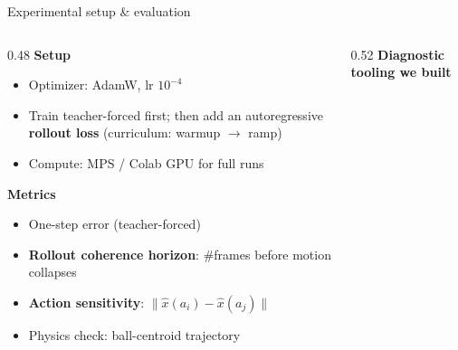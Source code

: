 \documentclass[aspectratio=169]{beamer}
\begin{document}
\begin{frame}{Experimental setup \& evaluation}
  \begin{columns}
    \begin{column}{0.48\textwidth}
      \textbf{Setup}
      \begin{itemize}
        \item Optimizer: AdamW, lr $10^{-4}$
        \item Train teacher-forced first; then add an autoregressive
              \textbf{rollout loss} (curriculum: warmup $\to$ ramp)
        \item Compute: MPS / Colab GPU for full runs
      \end{itemize}

      \vspace{0.5em}
      \textbf{Metrics}
      \begin{itemize}
        \item One-step error (teacher-forced)
        \item \textbf{Rollout coherence horizon}: \#frames before motion collapses
        \item \textbf{Action sensitivity}: $\|\hat{x}(a_i)-\hat{x}(a_j)\|$
        \item Physics check: ball-centroid trajectory
      \end{itemize}
    \end{column}
    \begin{column}{0.52\textwidth}
      \centering
      \textbf{Diagnostic tooling we built}
    \end{column}
  \end{columns}
\end{frame}
\end{document}
